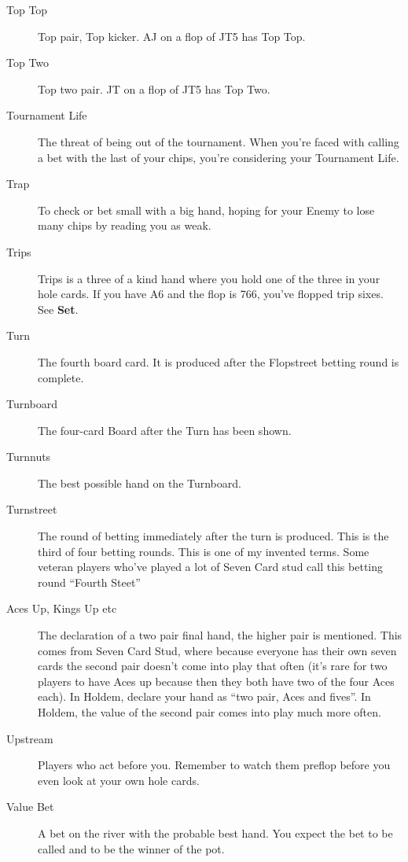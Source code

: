 \begin{description}
\item[Top Top] Top pair, Top kicker. AJ on a flop of JT5 has Top Top.

\item[Top Two] Top two pair. JT on a flop of JT5 has Top Two.

\item[Tournament Life] The threat of being out of the tournament. When
you're faced with calling a bet with the last of your chips, you're
considering your Tournament Life.

\item[Trap] To check or bet small with a big hand, hoping for your Enemy
to lose many chips by reading you as weak.

\item[Trips] Trips is a three of a kind hand where you hold one of the
three in your hole cards. If you have A6 and the flop is 766, you've
flopped trip sixes. See \textbf{Set}.

\item[Turn] The fourth board card. It is produced after the Flopstreet
betting round is complete.

\item[Turnboard] The four-card Board after the Turn has been shown.

\item[Turnnuts] The best possible hand on the Turnboard.

\item[Turnstreet] The round of betting immediately after the turn is
produced. This is the third of four betting rounds. This is one
of my invented terms. Some veteran players who've played a lot of
Seven Card stud call this betting round ``Fourth Steet''

\item[Aces Up, Kings Up etc] The declaration of a two pair final hand,
the higher pair is mentioned. This comes from Seven Card Stud, where
because everyone has their own seven cards the second pair doesn't
come into play that often (it's rare for two players to have
Aces up because then they both have two of the four Aces each). In
Holdem, declare your hand as ``two pair, Aces and fives''. In Holdem,
the value of the second pair comes into play much more often.

\item[Upstream] Players who act before you. Remember to watch them
preflop before you even look at your own hole cards.

\item[Value Bet] A bet on the river with the probable best hand. You
expect the bet to be called and to be the winner of the pot.


\end{description}
